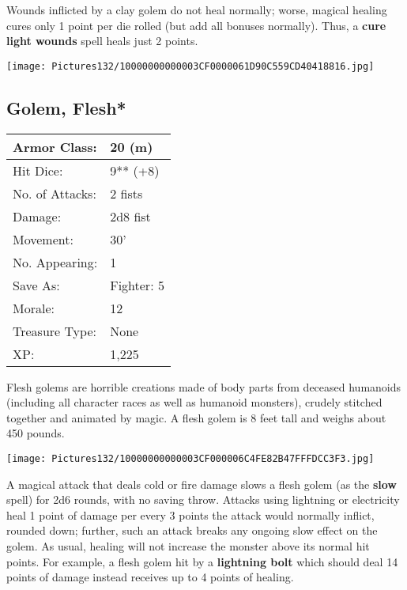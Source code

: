\documentclass[a4paper,twoside,openany,10pt]{book}
\begin{document}
\begin{multicols}{2}
Wounds inflicted by a clay golem do not heal normally; worse, magical healing cures only 1 point per die rolled (but add all bonuses normally). Thus, a \textbf{cure light wounds }spell heals just 2 points.


\begin{center}
	\texttt{[image: Pictures132/10000000000003CF0000061D90C559CD40418816.jpg]}
\end{center}

\subsection*{Golem, Flesh*}\label{golem-flesh}

\begin{tabularx}{0.48\textwidth}{@{}lX@{}}
Armor Class: & 20 (m) \\\hline
Hit Dice: & 9** (+8) \\\hline
No. of Attacks: & 2 fists \\\hline
Damage: & 2d8 fist \\\hline
Movement: & 30' \\\hline
No. Appearing: & 1 \\\hline
Save As: & Fighter: 5 \\\hline
Morale: & 12 \\\hline
Treasure Type: & None \\\hline
XP: & 1,225 \\\hline
\end{tabularx}\medskip

Flesh golems are horrible creations made of body parts from deceased humanoids (including all character races as well as humanoid monsters), crudely stitched together and animated by magic. A flesh golem is 8 feet tall and weighs about 450 pounds.


\begin{center}
	\texttt{[image: Pictures132/10000000000003CF000006C4FE82B47FFFDCC3F3.jpg]}
\end{center}

A magical attack that deals cold or fire damage slows a flesh golem (as the \textbf{slow }spell) for 2d6 rounds, with no saving throw. Attacks using lightning or electricity heal 1 point of damage per every 3 points the attack would normally inflict, rounded down; further, such an attack breaks any ongoing slow effect on the golem. As usual, healing will not increase the monster above its normal hit points. For example, a flesh golem hit by a \textbf{lightning bolt} which should deal 14 points of damage instead receives up to 4 points of healing.



\end{multicols}
\end{document}
